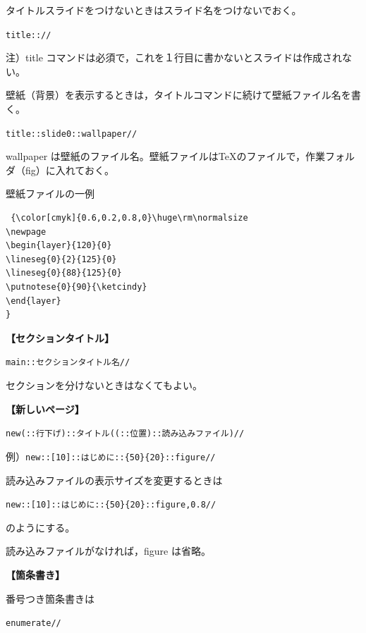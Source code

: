 \documentclass[papersize,a4paper,12pt,uplatex]{jsarticle}
\begin{document}
 タイトルスライドをつけないときはスライド名をつけないでおく。
 
\hspace{10mm} \verb|title:://|

注）title コマンドは必須で，これを１行目に書かないとスライドは作成されない。

\vspace{\baselineskip}
壁紙（背景）を表示するときは，タイトルコマンドに続けて壁紙ファイル名を書く。
 
 \hspace{10mm}\verb|title::slide0::wallpaper//|
 
wallpaper は壁紙のファイル名。壁紙ファイルはTeXのファイルで，作業フォルダ（fig）に入れておく。

壁紙ファイルの一例
 
\begin{verbatim}
 {\color[cmyk]{0.6,0.2,0.8,0}\huge\rm\normalsize
\newpage
\begin{layer}{120}{0}
\lineseg{0}{2}{125}{0}
\lineseg{0}{88}{125}{0}
\putnotese{0}{90}{\ketcindy}
\end{layer}
}
\end{verbatim}
 
\vspace{\baselineskip}
{\bf 【セクションタイトル】}
 
\hspace{10mm}\verb|main::セクションタイトル名//|
 
セクションを分けないときはなくてもよい。

\vspace{\baselineskip}
 {\bf 【新しいページ】}
 
\hspace{10mm}\verb|new(::行下げ)::タイトル((::位置)::読み込みファイル)//|
 
 例）\verb|new::[10]::はじめに::{50}{20}::figure//|
 
読み込みファイルの表示サイズを変更するときは
 
 \hspace{10mm}\verb|new::[10]::はじめに::{50}{20}::figure,0.8//|
 
のようにする。 

読み込みファイルがなければ，figure は省略。
 
\vspace{\baselineskip}
 {\bf 【箇条書き】}
 
番号つき箇条書きは

 \hspace{10mm}\verb|enumerate//|
 
\end{document}
